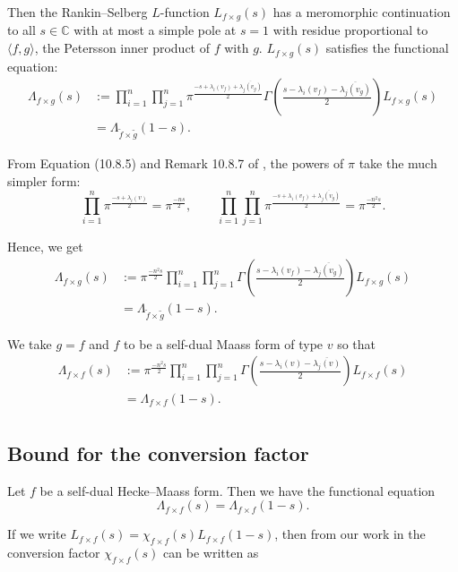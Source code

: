 \documentclass[sn-mathphys,Numbered]{sn-jnl}
\theoremstyle{thmstyleone}%
\theoremstyle{thmstyletwo}%
\theoremstyle{thmstylethree}%
\begin{document}
\noindent
Then the Rankin--Selberg $L$-function $L_{f \times g}(s)$ has a meromorphic continuation to all $s \in \mathbb{C}$ with at most a simple pole at $s=1$ with residue proportional to $\langle f,g \rangle$, the Petersson inner product of $f$ with $g$.
$L_{f \times g}(s)$ satisfies the functional equation:
\begin{align*}
\Lambda_{f \times g}(s) &:= \prod_{i=1}^n \prod_{j=1}^n \pi^{\frac{-s+\lambda_i(v_f)+\overline{\lambda_j(v_g)}}{2}} \Gamma \left( \frac{s-\lambda_i(v_f)-\overline{\lambda_j(v_g)}}{2} \right) L_{f \times g}(s) \\
&= \Lambda_{\tilde{f} \times \tilde{g}}(1-s).
\end{align*}

\noindent
From Equation (10.8.5) and Remark 10.8.7 of \cite{Dg}, the powers of $\pi$ take the much simpler form:
$$ \prod_{i=1}^n \pi^{\frac{-s+\lambda_i(v)}{2}} = \pi^{\frac{-ns}{2}} , \qquad \prod_{i=1}^n \prod_{j=1}^n \pi^{\frac{-s+\lambda_i(v_f)+\overline{\lambda_j(v_g)}}{2}} = \pi^{\frac{-n^2 s}{2}} .$$

\noindent
Hence, we get
\begin{align*}
\Lambda_{f \times g}(s) &:= \pi^{\frac{-n^2 s}{2}} \prod_{i=1}^n \prod_{j=1}^n \Gamma \left( \frac{s-\lambda_i(v_f)-\overline{\lambda_j(v_g)}}{2} \right) L_{f \times g}(s) \\
&= \Lambda_{\tilde{f} \times \tilde{g}}(1-s).
\end{align*}

\noindent
We take $g=f$ and $f$ to be a self-dual Maass form of type $v$ so that
\begin{align*}
\Lambda_{f \times f}(s) &:= \pi^{\frac{-n^2 s}{2}} \prod_{i=1}^n \prod_{j=1}^n \Gamma \left( \frac{s-\lambda_i(v)-\overline{\lambda_j(v)}}{2} \right) L_{f \times f}(s) \\
&= \Lambda_{f \times f}(1-s). \\
\end{align*}



\subsection{Bound for the conversion factor} 

Let $f$ be a self-dual Hecke--Maass form. Then we have the functional equation 
$$ \Lambda_{f \times f}(s) = \Lambda_{f \times f}(1-s) .$$


If we write $L_{f \times f}(s) = \chi_{f \times f}(s) L_{f \times f}(1-s)$, then from our work in \cite{AkAs} the conversion factor $\chi_{f \times f}(s)$ can be written as
\end{document}
